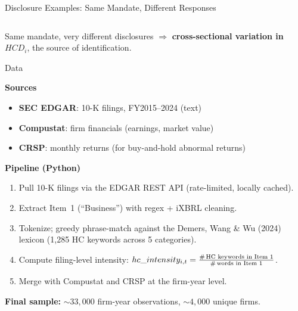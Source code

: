 \documentclass[aspectratio=169]{beamer}
\begin{document}
\begin{frame}{Disclosure Examples: Same Mandate, Different Responses}
\begin{columns}[T]
\end{columns}

\vspace{6pt}

{\scriptsize Same mandate, very different disclosures $\Rightarrow$ \textbf{cross-sectional variation in $HCD_i$}, the source of identification.}

\end{frame}

\begin{frame}{Data}

\textbf{Sources}
\begin{itemize}
  \item \textbf{SEC EDGAR}: 10-K filings, FY2015--2024 (text)
  \item \textbf{Compustat}: firm financials (earnings, market value)
  \item \textbf{CRSP}: monthly returns (for buy-and-hold abnormal returns)
\end{itemize}

\textbf{Pipeline (Python)}
\begin{enumerate}
  \item Pull 10-K filings via the EDGAR REST API (rate-limited, locally cached).
  \item Extract Item~1 (``Business'') with regex + iXBRL cleaning.
  \item Tokenize; greedy phrase-match against the Demers, Wang \& Wu (2024) lexicon
        (1{,}285 HC keywords across 5 categories).
  \item Compute filing-level intensity:
        $hc\_intensity_{i,t} = \frac{\text{\#\,HC keywords in Item 1}}{\text{\#\,words in Item 1}}$.
  \item Merge with Compustat and CRSP at the firm-year level.
\end{enumerate}

\textbf{Final sample:} $\sim 33{,}000$ firm-year observations, $\sim 4{,}000$ unique firms.

\end{frame}
\end{document}
